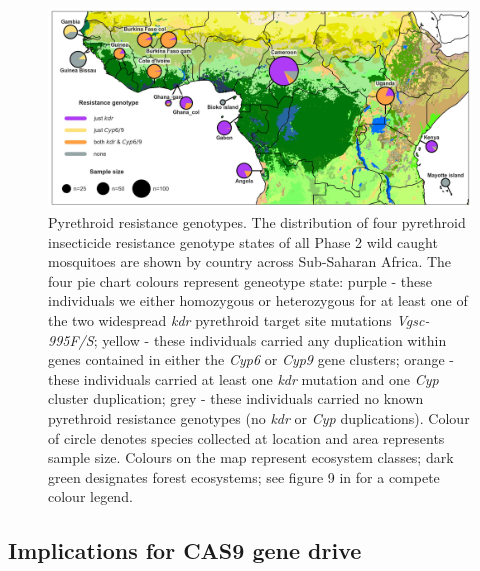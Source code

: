 \documentclass[a4paper,11pt,abstracton,hidelinks]{scrartcl}
\begin{document}
\begin{figure}[H]
	\begin{center}
		\includegraphics*[width=6.3in]{artwork/pyrethroid_resistance_map_purple-orange.jpg}
	\end{center}
	\caption{Pyrethroid resistance genotypes. The distribution of four pyrethroid insecticide resistance genotype states of all Phase 2 wild caught mosquitoes are shown by country across Sub-Saharan Africa. The four pie chart colours represent geneotype state: purple - these individuals we either homozygous or heterozygous for at least one of the two widespread \textit{kdr} pyrethroid target site mutations \textit{Vgsc-995F/S}; yellow - these individuals carried any duplication within genes contained in either the \textit{Cyp6} or \textit{Cyp9} gene clusters; orange - these individuals carried at least one \textit{kdr} mutation and one \textit{Cyp} cluster duplication; grey - these individuals carried no known pyrethroid resistance genotypes (no \textit{kdr} or \textit{Cyp} duplications). Colour of circle denotes species collected at location and area represents sample size. Colours on the map represent ecosystem classes; dark green designates forest ecosystems; see figure 9 in \cite{sayre2013} for a compete colour legend.}
	\label{ir}
\end{figure}


\subsection*{Implications for CAS9 gene drive}
\end{document}

